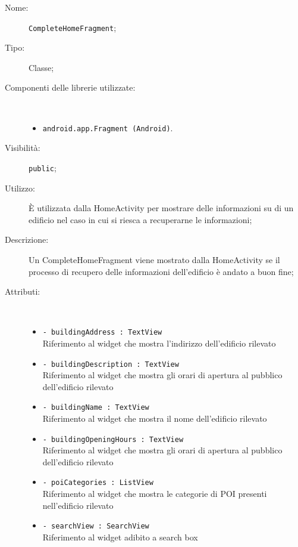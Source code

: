 \documentclass[../DefinizioneDiProdotto.tex]{subfiles}
\begin{document}
\begin{description}
	\item[Nome:] \texttt{CompleteHomeFragment};
	\item[Tipo:] Classe;
	\item[Componenti delle librerie utilizzate:] \
\begin{itemize}
\item \texttt{android.app.Fragment (Android)}.
\end{itemize}
	\item[Visibilità:] \texttt{public};
	\item[Utilizzo:] È utilizzata dalla HomeActivity per mostrare delle informazioni su di un edificio nel caso in cui si riesca a recuperarne le informazioni;
	\item[Descrizione:] Un CompleteHomeFragment viene mostrato dalla HomeActivity se il processo di recupero delle informazioni dell'edificio è andato a buon fine;
	\item[Attributi:] \
	\begin{itemize}
		\item \texttt{- buildingAddress : TextView}\\
		Riferimento al widget che mostra l'indirizzo dell'edificio rilevato
		
		\item \texttt{- buildingDescription : TextView}\\
		Riferimento al widget che mostra gli orari di apertura al pubblico dell'edificio rilevato
		
		\item \texttt{- buildingName : TextView}\\
		Riferimento al widget che mostra il nome dell'edificio rilevato
		
		\item \texttt{- buildingOpeningHours : TextView}\\
		Riferimento al widget che mostra gli orari di apertura al pubblico dell'edificio rilevato
		
		\item \texttt{- poiCategories : ListView}\\
		Riferimento al widget che mostra le categorie di POI presenti nell'edificio rilevato
		
		\item \texttt{- searchView : SearchView}\\
		Riferimento al widget adibito a search box
		

\end{itemize}
\end{description}
\end{document}
